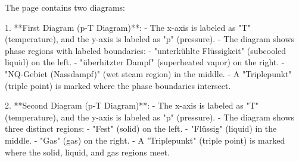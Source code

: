 The page contains two diagrams:  

1. **First Diagram (p-T Diagram)**:  
   - The x-axis is labeled as "T" (temperature), and the y-axis is labeled as "p" (pressure).  
   - The diagram shows phase regions with labeled boundaries:  
     - "unterkühlte Flüssigkeit" (subcooled liquid) on the left.  
     - "überhitzter Dampf" (superheated vapor) on the right.  
     - "NQ-Gebiet (Nassdampf)" (wet steam region) in the middle.  
   - A "Triplepunkt" (triple point) is marked where the phase boundaries intersect.  

2. **Second Diagram (p-T Diagram)**:  
   - The x-axis is labeled as "T" (temperature), and the y-axis is labeled as "p" (pressure).  
   - The diagram shows three distinct regions:  
     - "Fest" (solid) on the left.  
     - "Flüssig" (liquid) in the middle.  
     - "Gas" (gas) on the right.  
   - A "Triplepunkt" (triple point) is marked where the solid, liquid, and gas regions meet.
